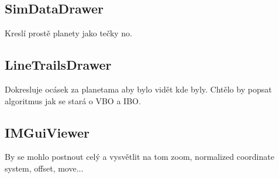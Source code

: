 \subsection{SimDataDrawer}
Kreslí prostě planety jako tečky no.
\subsection{LineTrailsDrawer}
Dokresluje ocásek za planetama aby bylo vidět kde byly. Chtělo by popsat algoritmus jak se stará o VBO a IBO.
\subsection{IMGuiViewer}
By se mohlo postnout celý a vysvětlit na tom zoom, normalized coordinate system, offset, move...


